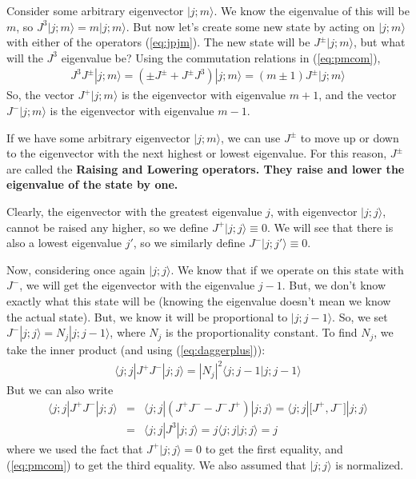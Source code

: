 \documentclass[12pt,epsf]{article}
\def\nolabel{\nonumber }
\def\nolabel{\nonumber }
\begin{document}
Consider some arbitrary eigenvector $|j;m\rangle$.  We know the
eigenvalue of this will be $m$, so $J^3|j;m\rangle = m|j;m\rangle$. 
But now let's create some new state by acting  on $|j;m\rangle$ with
either of the operators (\ref{eq:jpjm}).  The new state will be
$J^{\pm}|j;m\rangle$, but what will the $J^3$ eigenvalue be?  Using the
commutation relations in (\ref{eq:pmcom}), 
\begin{eqnarray}
J^3J^{\pm}|j;m\rangle = (\pm J^{\pm}+J^{\pm}J^3)|j;m\rangle =
(m\pm1)J^{\pm}|j;m\rangle \nolabel 
\end{eqnarray}
So, the vector $J^+|j;m\rangle$ is the eigenvector with eigenvalue
$m+1$, and the vector $J^-|j;m\rangle$ is the eigenvector with
eigenvalue $m-1$.  

If we have some arbitrary eigenvector $|j;m\rangle$, we can use
$J^{\pm}$ to move up or down to the eigenvector with the next highest
or lowest eigenvalue.  For this reason, $J^{\pm}$ are called the \bf
Raising \rm and \bf Lowering \rm operators.  They raise and lower the
eigenvalue of the state by one.  

Clearly, the eigenvector with the greatest eigenvalue $j$, with
eigenvector $|j;j\rangle$, cannot be raised any higher, so we define
$J^+|j;j\rangle \equiv 0$.  We will see that there is also a lowest
eigenvalue $j'$, so we similarly define $J^-|j;j'\rangle \equiv 0$.  

Now, considering once again $|j;j\rangle$.  We know that if we operate
on this state with $J^-$, we will get the eigenvector with the
eigenvalue $j-1$.  But, we don't know exactly what this state will be
(knowing the eigenvalue doesn't mean we know the actual state).  But,
we know it will be proportional to $|j;j-1\rangle$.  So, we set
$J^-|j;j\rangle = N_j|j;j-1\rangle$, where $N_j$ is the proportionality
constant.  To find $N_j$, we take the inner product (and using
(\ref{eq:daggerplus})):
\begin{eqnarray}
\langle j;j|J^+J^-|j;j\rangle = |N_j|^2\langle j;j-1|j;j-1\rangle
\nolabel 
\end{eqnarray}
But we can also write
\begin{eqnarray}
\langle j;j|J^+J^-|j;j\rangle &=& \langle j;j|(J^+J^- -
J^-J^+)|j;j\rangle = \langle j;j|\big[J^+,J^-\big]|j;j\rangle \nolabel
\\
&=& \langle j;j|J^3|j;j\rangle = j\langle j;j|j;j\rangle = j
\label{eq:littlej}
\end{eqnarray}
where we used the fact that $J^+|j;j\rangle = 0 $ to get the first
equality, and (\ref{eq:pmcom}) to get the third equality.  We also
assumed that $|j;j\rangle$ is normalized.  
\end{document}

